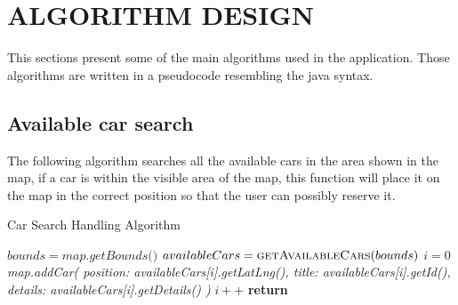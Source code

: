 \section{ALGORITHM DESIGN}

This sections present some of the main algorithms used in the application. Those algorithms are written
in a pseudocode resembling the java syntax.

\subsection{Available car search}
The following algorithm searches all the available cars in the area shown in the map, if a car
is within the visible area of the map, this function will place it on the map in the correct position
so that the user can possibly reserve it.

\begin{algorithm}
\begin{algorithmic}[1]
  \caption{\label{alg:stdreqhandler} Car Search Handling Algorithm}

    \State $ bounds = \textit{map.getBounds()} $
    \State $ availableCars = \Call {getAvailableCars}{bounds} $
    \State $ i = \textit{0}$
      \State \textit{map.addCar(
        \State position: availableCars[i].getLatLng(),
        \State title: availableCars[i].getId(),
        \State details: availableCars[i].getDetails()
      \State )}
      \State $ i++ $
    \EndFor
    \State \textbf{return}
  \EndFunction

\end{algorithmic}
\end{algorithm}

